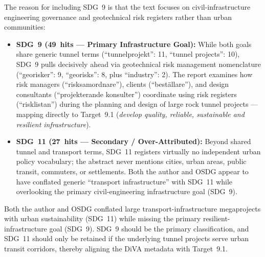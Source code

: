 \begin{casestudySection}
The reason for including \gls{SDG}~9 is that the text focuses on civil-infrastructure engineering governance and geotechnical risk registers rather than urban communities:
\begin{itemize}
    \item \textbf{\gls{SDG}~9 (\num{49}~hits --- Primary Infrastructure Goal):} While both goals share generic tunnel terms (\enquote{\foreignlanguage{swedish}{tunnelprojekt}}: 11, \enquote{tunnel projects}: 10), \gls{SDG}~9 pulls decisively ahead via geotechnical risk management nomenclature (\enquote{\foreignlanguage{swedish}{georisker}}: 9, \enquote{georisks}: 8, plus \enquote{industry}: 2). The report examines how risk managers (\enquote{\foreignlanguage{swedish}{risksamordnare}}), clients (\enquote{\foreignlanguage{swedish}{beställare}}), and design consultants (\enquote{\foreignlanguage{swedish}{projekterande konsulter}}) coordinate using risk registers (\enquote{\foreignlanguage{swedish}{risklistan}}) during the planning and design of large rock tunnel projects --- mapping directly to Target~9.1 (\emph{develop quality, reliable, sustainable and resilient infrastructure}).
    
    \item \textbf{\gls{SDG}~11 (\num{27}~hits --- Secondary / Over-Attributed):} Beyond shared tunnel and transport terms, \gls{SDG}~11 registers virtually no independent urban policy vocabulary; the abstract never mentions cities, urban areas, public transit, commuters, or settlements. Both the author and OSDG appear to have conflated generic \enquote{transport infrastructure} with \gls{SDG}~11 while overlooking the primary civil-engineering infrastructure goal (\gls{SDG}~9).
\end{itemize}
\end{casestudySection}

\begin{takeaway}
Both the author and OSDG conflated large transport-infrastructure megaprojects with urban sustainability (\gls{SDG}~11) while missing the primary resilient-infrastructure goal (\gls{SDG}~9). \gls{SDG}~9 should be the primary classification, and \gls{SDG}~11 should only be retained if the underlying tunnel projects serve urban transit corridors, thereby aligning the \gls{DiVA} metadata with Target~9.1.
\end{takeaway}

